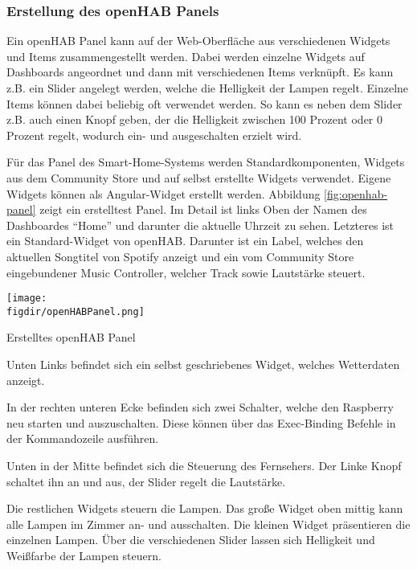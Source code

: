 		\subsubsection{Erstellung des openHAB Panels}
		Ein openHAB Panel kann auf der Web-Oberfläche aus verschiedenen Widgets und Items zusammengestellt werden. Dabei werden einzelne Widgets auf Dashboards angeordnet und dann mit verschiedenen Items verknüpft. Es kann z.B. ein Slider angelegt werden, welche die Helligkeit der Lampen regelt. Einzelne Items können dabei beliebig oft verwendet werden. So kann es neben dem Slider z.B. auch einen Knopf geben, der die Helligkeit zwischen 100 Prozent oder 0 Prozent regelt, wodurch ein- und ausgeschalten erzielt wird.
		
		Für das Panel des Smart-Home-Systems werden Standardkomponenten, Widgets aus dem Community Store und auf selbst erstellte Widgets verwendet. Eigene Widgets können als Angular-Widget erstellt werden.
		Abbildung \ref{fig:openhab-panel} zeigt ein erstelltest Panel. Im Detail ist links Oben der Namen des Dashboardes "`Home"' und darunter die aktuelle Uhrzeit zu sehen. Letzteres ist ein Standard-Widget von openHAB.
		Darunter ist ein Label, welches den aktuellen Songtitel von Spotify anzeigt und ein vom Community Store eingebundener Music Controller, welcher Track sowie Lautstärke steuert.\\
		\begin{minipage}{\textwidth}
			\centering
			\captionsetup{type=figure}
			\texttt{[image: \\figdir/openHABPanel.png]}
			\caption{Erstelltes openHAB Panel \label{fig:openhab-panel}}
		\end{minipage}
		\smallskip

		Unten Links befindet sich ein selbst geschriebenes Widget, welches Wetterdaten anzeigt.

		In der rechten unteren Ecke befinden sich zwei Schalter, welche den Raspberry neu starten und auszuschalten. Diese können über das Exec-Binding Befehle in der Kommandozeile ausführen.
		
		Unten in der Mitte befindet sich die Steuerung des Fernsehers. Der Linke Knopf schaltet ihn an und aus, der Slider regelt die Lautstärke.
		
		Die restlichen Widgets steuern die Lampen. Das große Widget oben mittig kann alle Lampen im Zimmer an- und ausschalten. Die kleinen Widget präsentieren die einzelnen Lampen. Über die verschiedenen Slider lassen sich Helligkeit und Weißfarbe der Lampen steuern.
		
